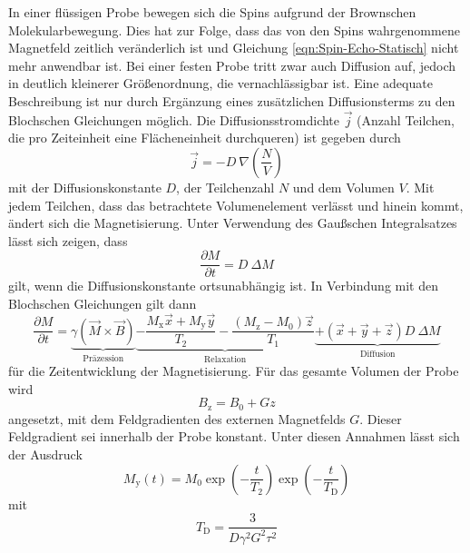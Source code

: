 In einer flüssigen Probe bewegen sich die Spins aufgrund der Brownschen
Molekularbewegung.
Dies hat zur Folge, dass das von den Spins wahrgenommene Magnetfeld
zeitlich veränderlich ist und Gleichung \eqref{eqn:Spin-Echo-Statisch} nicht mehr
anwendbar ist.
Bei einer festen Probe tritt zwar auch Diffusion auf, jedoch in deutlich kleinerer
Größenordnung, die vernachlässigbar ist.
Eine adequate Beschreibung ist nur durch Ergänzung eines zusätzlichen Diffusionsterms
zu den Blochschen Gleichungen möglich.
Die Diffusionsstromdichte $\vec{j}$ (Anzahl Teilchen, die pro Zeiteinheit eine
Flächeneinheit durchqueren) ist gegeben durch
\begin{equation*}
  \vec{j} = - D\:\nabla\!\left(\frac{N}{V}\right)
\end{equation*}
mit der Diffusionskonstante $D$, der Teilchenzahl $N$ und dem Volumen $V$.
Mit jedem Teilchen, dass das betrachtete Volumenelement verlässt und hinein kommt,
ändert sich die Magnetisierung.
Unter Verwendung des Gaußschen Integralsatzes lässt sich zeigen, dass
\begin{equation*}
  \frac{\partial M}{\partial t} = D\:\Delta M
\end{equation*}
gilt, wenn die Diffusionskonstante ortsunabhängig ist.
In Verbindung mit den Blochschen Gleichungen gilt dann
\begin{equation*}
  \frac{\partial M}{\partial t} =
  \underbrace{\gamma \left(\vec{M} \times \vec{B}\right)}_{\text{Präzession}}
  \underbrace{- \frac{M_\text{x} \vec{x} + M_\text{y} \vec{y}}{T_2}
  - \frac{\left(M_\text{z} - M_0\right) \vec{z}}{T_1}}_{\text{Relaxation}}
  \underbrace{+ \left(\vec{x} + \vec{y} + \vec{z}\right) D\:\Delta M}_{\text{Diffusion}}
\end{equation*}
für die Zeitentwicklung der Magnetisierung.
Für das gesamte Volumen der Probe wird
\begin{equation*}
  B_\text{z} = B_0 + G z
\end{equation*}
angesetzt, mit dem Feldgradienten des externen Magnetfelds $G$.
Dieser Feldgradient sei innerhalb der Probe konstant.
Unter diesen Annahmen lässt sich der Ausdruck
\begin{equation*}
  M_\text{y}\!\left(t\right) = M_0
  \exp\!\left(- \frac{t}{T_2}\right)
  \exp\!\left(- \frac{t}{T_\text{D}}\right)
\end{equation*}
mit
\begin{equation*}
  T_\text{D} = \frac{3}{D \gamma^2 G^2 \tau^2}
\end{equation*}
